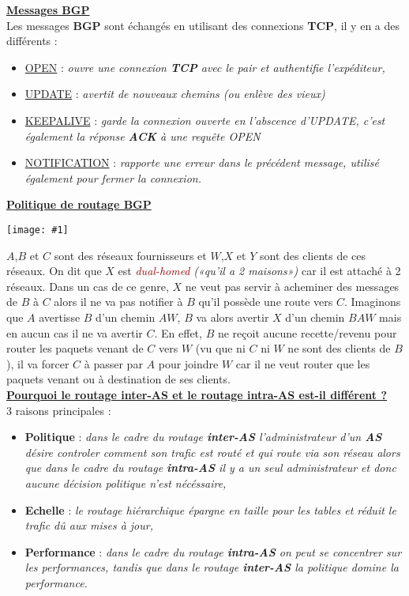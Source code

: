 \documentclass{article}
\newcommand{\ora}[1]{\textcolor{darko}{#1}}
\newcommand{\red}[1]{\textcolor{darkred}{#1}}
\newcommand{\imgR}[2]{\begin{center}\texttt{[image: \#1]}\end{center}}
\newcommand{\point}[2]{\item \ora{\underline{#1}} : \textit{#2}}
\newcommand{\bfp}[2]{\item \textbf{#1} : \textit{#2}}
\begin{document}
\textbf{\underline{Messages BGP}} \\

Les messages \textbf{BGP} sont échangés en utilisant des connexions \textbf{TCP}, il y en a des différents : 
\begin{itemize}
\point{OPEN}{ouvre une connexion \textbf{TCP} avec le pair et authentifie l'expéditeur,}
\point{UPDATE}{avertit de nouveaux chemins (ou enlève des vieux)}
\point{KEEPALIVE}{garde la connexion ouverte en l'abscence d'UPDATE, c'est également la réponse \textbf{ACK} à 
une requête OPEN}
\point{NOTIFICATION}{rapporte une erreur dans le précédent message, utilisé également pour fermer la connexion.}
\end{itemize}

\textbf{\underline{Politique de routage BGP}} \\

\imgR{CN_096.png}{300}

$A$,$B$ et $C$ sont des réseaux fournisseurs et $W$,$X$ et $Y$ sont des clients de ces réseaux. On dit que $X$ 
est \red{\textit{dual-homed}} \textit{(«qu'il a 2 maisons»)} car il est attaché à 2 réseaux. Dans un cas de ce 
genre, $X$ ne veut pas servir à acheminer des messages de $B$ à $C$ alors il ne va pas notifier à $B$ qu'il 
possède une route vers $C$. Imaginons que $A$ avertisse $B$ d'un chemin $AW$, $B$ va alors avertir $X$ d'un 
chemin $BAW$ mais en aucun cas il ne va avertir $C$. En effet, $B$ ne reçoit aucune recette/revenu pour router 
les paquets venant de $C$ vers $W$ (vu que ni $C$ ni $W$ ne sont des clients de $B$), il va forcer $C$ à passer 
par $A$ pour joindre $W$ car il ne veut router que les paquets venant ou à destination de ses clients. \\

\textbf{\underline{Pourquoi le routage inter-AS et le routage intra-AS est-il différent ?}} \\

3 raisons principales : 
\begin{itemize}
\bfp{Politique}{dans le cadre du routage \textbf{inter-AS} l'administrateur d'un \textbf{AS} désire controler 
comment son trafic est routé et qui route via son réseau alors que dans le cadre du routage \textbf{intra-AS} il
y a un seul administrateur et donc aucune décision politique n'est nécéssaire,}
\bfp{Echelle}{le routage hiérarchique épargne en taille pour les tables et réduit le trafic dû aux mises à jour,}
\bfp{Performance}{dans le cadre du routage \textbf{intra-AS} on peut se concentrer sur les performances, tandis
que dans le routage \textbf{inter-AS} la politique domine la performance.}
\end{itemize}
\end{document}
